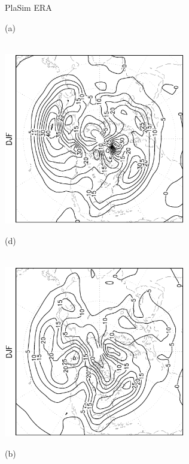\documentclass[12pt,a4paper,twoside,openright,headinclude,liststotoc,bibtotoc]{scrreprt}
\begin{document}
\begin{figure}[b]
\hspace{3.5cm}PlaSim \vspace{0.2cm} \hspace{7.3cm} ERA \\
\parbox{8.5cm}{\hspace{0.90cm}\begin{scriptsize}(a)\end{scriptsize} \vspace{-0.5cm} \\
\includegraphics[height=7.5cm,angle=-90]
{eps/PLDJF850fluxes_tr.eps}
}
\parbox{8.5cm}{\hspace{0.95cm}\begin{scriptsize}(d)\end{scriptsize} \vspace{-0.5cm} \\
\includegraphics[height=7.5cm,angle=-90]
{eps/ERADJF850fluxes_tr.eps}
}
\parbox{8.5cm}{\hspace{0.90cm}\begin{scriptsize}(b)\end{scriptsize} \vspace{-0.2cm} \\
}
\end{figure}
\end{document}
